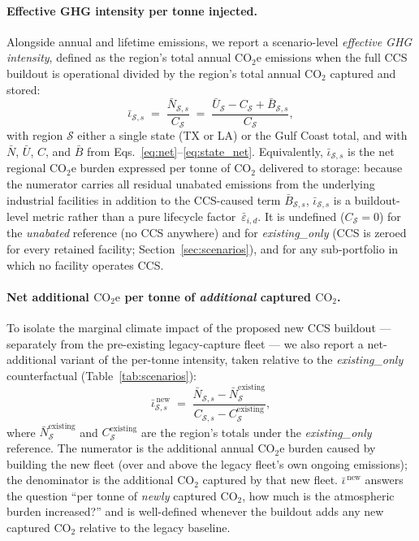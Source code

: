 \documentclass[11pt]{article}
\newcommand{\cotwo}{\ensuremath{\mathrm{CO_2}}}
\newcommand{\cotwoe}{\ensuremath{\mathrm{CO_{2}e}}}
\begin{document}
\paragraph{Effective GHG intensity per tonne injected.}
Alongside annual and lifetime emissions, we report a scenario-level \emph{effective GHG intensity}, defined as the region's total annual \cotwoe{} emissions when the full CCS buildout is operational divided by the region's total annual \cotwo{} captured and stored:
%
\begin{equation}
  \bar{\iota}_{\mathcal{S},s} \;=\; \frac{\bar{N}_{\mathcal{S},s}}{C_{\mathcal{S}}}
  \;=\; \frac{\bar{U}_{\mathcal{S}} - C_{\mathcal{S}} + \bar{B}_{\mathcal{S},s}}{C_{\mathcal{S}}},
  \label{eq:intensity_per_tonne}
\end{equation}
%
with region $\mathcal{S}$ either a single state (TX or LA) or the Gulf Coast total, and with $\bar{N}$, $\bar{U}$, $C$, and $\bar{B}$ from Eqs.~\eqref{eq:net}--\eqref{eq:state_net}. Equivalently, $\bar{\iota}_{\mathcal{S},s}$ is the net regional \cotwoe{} burden expressed per tonne of \cotwo{} delivered to storage: because the numerator carries all residual unabated emissions from the underlying industrial facilities in addition to the CCS-caused term $\bar{B}_{\mathcal{S},s}$, $\bar{\iota}_{\mathcal{S},s}$ is a buildout-level metric rather than a pure lifecycle factor~$\bar\varepsilon_{i,d}$. It is undefined ($C_{\mathcal{S}} = 0$) for the \emph{unabated} reference (no CCS anywhere) and for \emph{existing\_only} (CCS is zeroed for every retained facility; Section~\ref{sec:scenarios}), and for any sub-portfolio in which no facility operates CCS.

\paragraph{Net additional \cotwoe{} per tonne of \emph{additional} captured \cotwo{}.}
To isolate the marginal climate impact of the proposed new CCS buildout --- separately from the pre-existing legacy-capture fleet --- we also report a net-additional variant of the per-tonne intensity, taken relative to the \emph{existing\_only} counterfactual (Table~\ref{tab:scenarios}):
%
\begin{equation}
  \bar{\iota}^{\,\text{new}}_{\mathcal{S},s} \;=\; \frac{\bar{N}_{\mathcal{S},s} - \bar{N}_{\mathcal{S}}^{\text{existing}}}{C_{\mathcal{S},s} - C_{\mathcal{S}}^{\text{existing}}},
  \label{eq:intensity_per_tonne_new}
\end{equation}
%
where $\bar{N}^{\text{existing}}_{\mathcal{S}}$ and $C^{\text{existing}}_{\mathcal{S}}$ are the region's totals under the \emph{existing\_only} reference. The numerator is the additional annual \cotwoe{} burden caused by building the new fleet (over and above the legacy fleet's own ongoing emissions); the denominator is the additional \cotwo{} captured by that new fleet. $\bar{\iota}^{\,\text{new}}$ answers the question ``per tonne of \emph{newly} captured \cotwo{}, how much is the atmospheric burden increased?'' and is well-defined whenever the buildout adds any new captured \cotwo{} relative to the legacy baseline.
\end{document}
